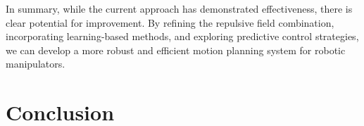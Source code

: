 \documentclass[letterpaper, 10 pt, conference]{ieeeconf}  %
\begin{document}
In summary, while the current approach has demonstrated effectiveness, there is clear potential for improvement. By refining the repulsive field combination, incorporating learning-based methods, and exploring predictive control strategies, we can develop a more robust and efficient motion planning system for robotic manipulators.

\section{Conclusion}

%

\end{document}
